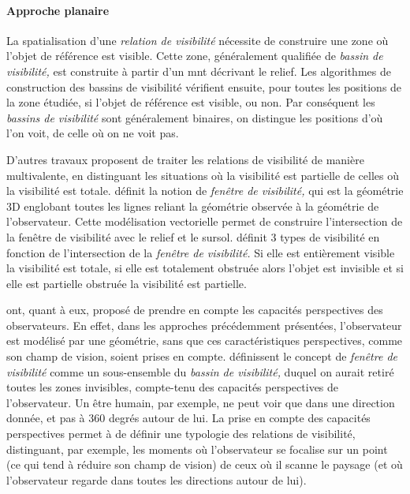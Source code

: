 
\paragraph{Approche planaire}

La spatialisation d'une \emph{relation de visibilité} nécessite de
construire une zone où l'objet de référence est visible. Cette zone,
généralement qualifiée de \emph{bassin de visibilité,} est construite
à partir d'un \ac{mnt} décrivant le relief. Les algorithmes de
construction des bassins de visibilité vérifient ensuite, pour toutes
les positions de la zone étudiée, si l'objet de référence est visible,
ou non. Par conséquent les \emph{bassins de visibilité} sont
généralement binaires, on distingue les positions d'où l'on voit, de
celle où on ne voit pas.

D'autres travaux proposent de traiter les relations de visibilité de
manière multivalente, \ie en distinguant les situations où la
visibilité est partielle de celles où la visibilité est
totale. \textcite{Ramos2003} définit la notion de \emph{fenêtre de
  visibilité,} qui est la géométrie 3D englobant toutes les lignes
reliant la géométrie observée à la géométrie de l'observateur. Cette
modélisation vectorielle permet de construire l'intersection de la
fenêtre de visibilité avec le relief et le
sursol. \textcite{Ramos2003} définit 3 types de visibilité en fonction
de l'intersection de la \emph{fenêtre de visibilité.} Si elle est
entièrement visible la visibilité est totale, si elle est totalement
obstruée alors l'objet est invisible et si elle est partielle obstruée
la visibilité est partielle.

\textcite{Lonergan2016} ont, quant à eux, proposé de prendre en compte
les capacités perspectives des observateurs. En effet, dans les
approches précédemment présentées, l'observateur est modélisé par une
géométrie, sans que ces caractéristiques perspectives, comme son champ
de vision, soient prises en compte. \textcite{Lonergan2016}
définissent le concept de \emph{fenêtre de visibilité} comme un
sous-ensemble du \emph{bassin de visibilité,} duquel on aurait retiré
toutes les zones invisibles, compte-tenu des capacités perspectives de
l'observateur. Un être humain, par exemple, ne peut voir que dans une
direction donnée, et pas à 360 degrés autour de lui. La prise en
compte des capacités perspectives permet à \textcite{Lonergan2016} de
définir une typologie des relations de visibilité, distinguant, par
exemple, les moments où l'observateur se focalise sur un point (ce qui
tend à réduire son champ de vision) de ceux où il scanne le paysage
(et où l'observateur regarde dans toutes les directions autour de
lui).

